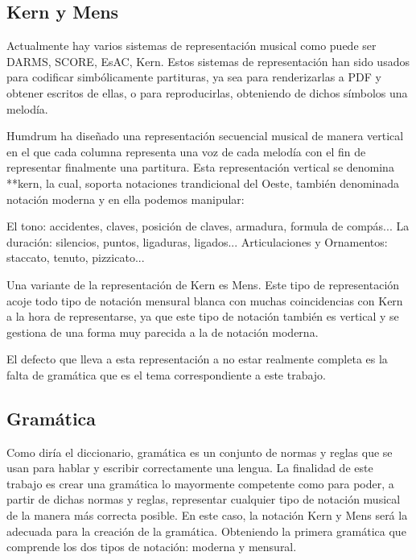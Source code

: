 \documentclass{article}
\begin{document}
\subsection{Kern y Mens}
 Actualmente hay varios sistemas de representación musical como puede ser DARMS, SCORE, EsAC, Kern. Estos sistemas
de representación han sido usados para codificar simbólicamente partituras, ya sea para renderizarlas a PDF y obtener escritos de ellas, o para
reproducirlas, obteniendo de dichos símbolos una melodía.

Humdrum ha diseñado una representación secuencial musical de manera vertical
en el que cada columna representa una voz de cada melodía
con el fin de representar finalmente una partitura. Esta representación vertical se denomina **kern, la cual,
soporta notaciones trandicional del Oeste,
también denominada notación moderna y en ella podemos manipular:

    El tono: accidentes, claves, posición de claves, armadura, formula de compás...
    La duración: silencios, puntos, ligaduras, ligados...
    Articulaciones y Ornamentos: staccato, tenuto, pizzicato...


Una variante de la representación de Kern es Mens. Este tipo de representación acoje todo tipo de notación mensural blanca
con muchas coincidencias con Kern a la hora de representarse, ya que este tipo de notación también es vertical y se gestiona
de una forma muy parecida a la de notación moderna.

El defecto que lleva a esta representación a no estar realmente completa es la falta de gramática que es el tema correspondiente
a este trabajo.

\subsection{Gramática}
    Como diría el diccionario, gramática es un conjunto de normas y reglas que se usan para hablar y escribir correctamente una lengua.
La finalidad de este trabajo es crear una gramática lo mayormente competente como para poder, a partir de dichas normas y reglas, representar
cualquier tipo de notación musical de la manera más correcta posible. En este caso, la notación Kern y Mens será la adecuada para la creación
de la gramática.
    Obteniendo la primera gramática que comprende los dos tipos de notación: moderna y mensural.
\end{document}
